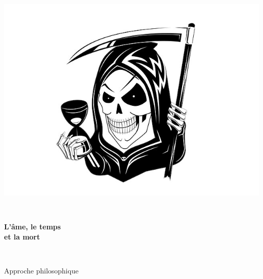 \begin{titlepage}
%

\begin{center}
\includegraphics[scale=1.3]{./presentation/mort}
\end{center}

\textsc{\Large }\\[0.5cm]

\HRule

\begin{center}
{\huge \bfseries  L'âme, le temps \\
et la mort\\[0.4cm] }
\end{center}

\HRule \\[1.5cm]


\begin{minipage}{0.4\textwidth}
\begin{flushleft} \large
Approche philosophique
\end{flushleft}
\end{minipage}
\begin{minipage}{0.4\textwidth}
\begin{flushright} \large
\end{flushright}
\end{minipage}

\vfill



\end{titlepage}
